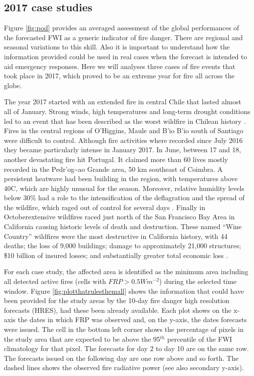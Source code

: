 \documentclass[, manuscript]{copernicus}
\begin{document}
\subsection{2017 case studies}

Figure \ref{fig:pod} provides an averaged assessment of the global
performances of the forecasted FWI as a generic indicator of fire
danger. There are regional and seasonal variations to this skill. Also
it is important to understand how the information provided could be used
in real cases when the forecast is intended to aid emergency responses.
Here we will analyses three cases of fire events that took place in
2017, which proved to be an extreme year for fire all across the globe.

The year 2017 started with an extended fire in central Chile that lasted
almost all of January. Strong winds, high temperatures and long-term
drought conditions led to an event that has been described as the worst
wildfire in Chilean history \citep{bowman:18}. Fires in the central
regions of O'Higgins, Maule and B'io B'io south of Santiago were
difficult to control. Although fire activities where recorded since July
2016 they became particularly intense in January 2017. In June, between
17 and 18, another devastating fire hit Portugal. It claimed more than
60 lives mostly recorded in the Pedr'og\textasciitilde{}ao Grande area,
50 km southeast of Coimbra. A persistent heatwave had been building in
the region, with temperatures above 40C, which are highly unusual for
the season. Moreover, relative humidity levels below 30\% had a role to
the intensification of the deflagration and the spread of the wildfire,
which raged out of control for several days \citep{boer:17}. Finally in
Octoberextensive wildfires raced just north of the San Francisco Bay
Area in California causing historic levels of death and destruction.
These named ``Wine Country'' wildfires were the most destructive in
California history, with 44 deaths; the loss of 9,000 buildings; damage
to approximately 21,000 structures; \$10 billion of insured losses; and
substantially greater total economic loss \citep{nauslar:18,mass:19}.

For each case study, the affected area is identified as the minimum area
including all detected active fires (cells with \(FRP > 0.5 Wm^{-2}\))
during the selected time window. Figure \ref{fig:plotthatrulesthemall}
shows the information that could have been provided for the study areas
by the 10-day fire danger high resolution forecasts (HRES), had these
been already available. Each plot shows on the x-axis the dates in which
FRP was observed and, on the y-axis, the dates forecasts were issued.
The cell in the bottom left corner shows the percentage of pixels in the
study area that are expected to be above the 95\(^{th}\) percentile of
the FWI climatology for that pixel. The forecasts for day 2 to day 10
are on the same row. The forecasts issued on the following day are one
row above and so forth. The dashed lines shows the observed fire
radiative power (see also secondary y-axis).
\end{document}
